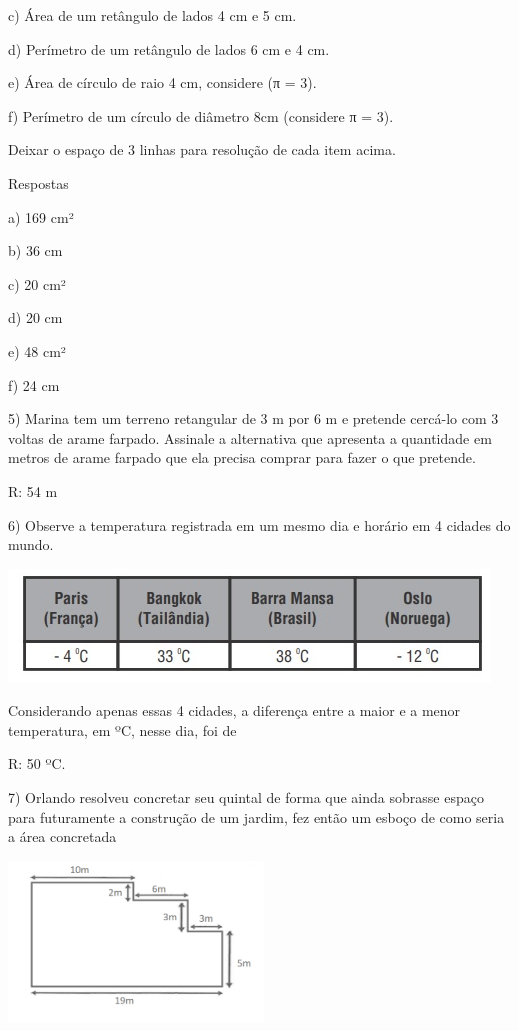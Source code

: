c) Área de um retângulo de lados 4 cm e 5 cm.

d) Perímetro de um retângulo de lados 6 cm e 4 cm.

e) Área de círculo de raio 4 cm, considere (π = 3).

f) Perímetro de um círculo de diâmetro 8cm (considere π = 3).

Deixar o espaço de 3 linhas para resolução de cada item acima.

Respostas

a) 169 cm²

b) 36 cm

c) 20 cm²

d) 20 cm

e) 48 cm²

f) 24 cm

5) Marina tem um terreno retangular de 3 m por 6 m e pretende cercá-lo
com 3 voltas de arame farpado. Assinale a alternativa que apresenta a
quantidade em metros de arame farpado que ela precisa comprar para fazer
o que pretende.

R: 54 m

6) Observe a temperatura registrada em um mesmo dia e horário em 4
cidades do mundo.

\includegraphics[width=5.03125in,height=1.1875in]{./imgSAEB_6_MAT/media/image96.png}

Considerando apenas essas 4 cidades, a diferença entre a maior e a menor
temperatura, em ºC, nesse dia, foi de

R: 50 ºC.

7) Orlando resolveu concretar seu quintal de forma que ainda sobrasse
espaço para futuramente a construção de um jardim, fez então um esboço
de como seria a área concretada

\includegraphics[width=2.66667in,height=1.6914in]{./imgSAEB_6_MAT/media/image97.png}

